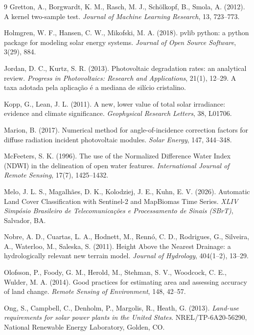 \documentclass[11pt,a4paper,oneside]{book}
\begin{document}
\begin{thebibliography}{9}
Gretton, A., Borgwardt, K. M., Rasch, M. J., Schölkopf, B., Smola, A. (2012).
A kernel two-sample test. \emph{Journal of Machine Learning Research}, 13,
723--773.

Holmgren, W. F., Hansen, C. W., Mikofski, M. A. (2018). pvlib python: a python
package for modeling solar energy systems. \emph{Journal of Open Source
Software}, 3(29), 884.

Jordan, D. C., Kurtz, S. R. (2013). Photovoltaic degradation rates: an
analytical review. \emph{Progress in Photovoltaics: Research and Applications},
21(1), 12--29. A taxa adotada pela aplicação é a mediana de silício cristalino.

Kopp, G., Lean, J. L. (2011). A new, lower value of total solar irradiance:
evidence and climate significance. \emph{Geophysical Research Letters}, 38,
L01706.

Marion, B. (2017). Numerical method for angle-of-incidence correction factors
for diffuse radiation incident photovoltaic modules. \emph{Solar Energy}, 147,
344--348.

McFeeters, S. K. (1996). The use of the Normalized Difference Water Index
(NDWI) in the delineation of open water features. \emph{International Journal of
Remote Sensing}, 17(7), 1425--1432.

Melo, J. L. S., Magalhães, D. K., Kolodziej, J. E., Kuhn, E. V. (2026).
Automatic Land Cover Classification with Sentinel-2 and MapBiomas Time Series.
\emph{XLIV Simpósio Brasileiro de Telecomunicações e Processamento de Sinais
(SBrT)}, Salvador, BA.

Nobre, A. D., Cuartas, L. A., Hodnett, M., Rennó, C. D., Rodrigues, G.,
Silveira, A., Waterloo, M., Saleska, S. (2011). Height Above the Nearest
Drainage: a hydrologically relevant new terrain model. \emph{Journal of
Hydrology}, 404(1--2), 13--29.

Olofsson, P., Foody, G. M., Herold, M., Stehman, S. V., Woodcock, C. E.,
Wulder, M. A. (2014). Good practices for estimating area and assessing accuracy
of land change. \emph{Remote Sensing of Environment}, 148, 42--57.

Ong, S., Campbell, C., Denholm, P., Margolis, R., Heath, G. (2013).
\emph{Land-use requirements for solar power plants in the United States}.
NREL/TP-6A20-56290, National Renewable Energy Laboratory, Golden, CO.


\end{thebibliography}
\end{document}

